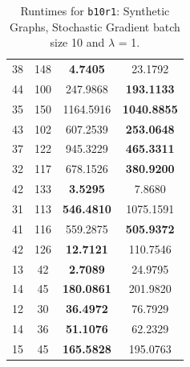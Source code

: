 \documentclass{article}
\begin{document}
\begin{table}[h]
\begin{tabular}{lccc}
38 & 148 & \textbf{4.7405} & 23.1792 \\
44 & 100 & 247.9868 & \textbf{193.1133} \\
35 & 150 & 1164.5916 & \textbf{1040.8855} \\
43 & 102 & 607.2539 & \textbf{253.0648} \\
37 & 122 & 945.3229 & \textbf{465.3311} \\
32 & 117 & 678.1526 & \textbf{380.9200} \\
42 & 133 & \textbf{3.5295} & 7.8680 \\
31 & 113 & \textbf{546.4810} & 1075.1591 \\
41 & 116 & 559.2875 & \textbf{505.9372} \\
42 & 126 & \textbf{12.7121} & 110.7546 \\
13 & 42 & \textbf{2.7089} & 24.9795 \\
14 & 45 & \textbf{180.0861} & 201.9820 \\
12 & 30 & \textbf{36.4972} & 76.7929 \\
14 & 36 & \textbf{51.1076} & 62.2329 \\
15 & 45 & \textbf{165.5828} & 195.0763 \\
\bottomrule
\end{tabular}
\caption{Runtimes for \texttt{b10r1}: Synthetic Graphs, Stochastic Gradient batch size 10 and $\lambda$ = 1.}
\end{table}
\end{document}
